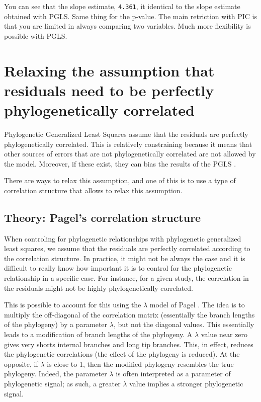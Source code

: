 \documentclass[
]{book}
\begin{document}
You can see that the slope estimate, \texttt{4.361}, it identical to the slope estimate obtained with PGLS. Same thing for the p-value. The main retriction with PIC is that you are limited in always comparing two variables. Much more flexibility is possible with PGLS.

\chapter{Relaxing the assumption that residuals need to be perfectly phylogenetically correlated}\label{relaxing-the-assumption-that-residuals-need-to-be-perfectly-phylogenetically-correlated}

Phylogenetic Generalized Least Squares assume that the residuals are perfectly phylogenetically correlated. This is relatively constraining because it means that other sources of errors that are not phylogenetically correlated are not allowed by the model. Moreover, if these exist, they can bias the results of the PGLS \citep{revell2010phylogenetic}.

There are ways to relax this assumption, and one of this is to use a type of correlation structure that allows to relax this assumption.

\section{Theory: Pagel's correlation structure}\label{theory-pagels-correlation-structure}

When controling for phylogenetic relationships with phylogenetic generalized least squares, we assume that the residuals are perfectly correlated according to the correlation structure. In practice, it might not be always the case and it is difficult to really know how important it is to control for the phylogenetic relationship in a specific case. For instance, for a given study, the correlation in the residuals might not be highly phylogenetically correlated.

This is possible to account for this using the \(\lambda\) model of Pagel \citep{pagel1999inferring}. The idea is to multiply the off-diagonal of the correlation matrix (essentially the branch lengths of the phylogeny) by a parameter \(\lambda\), but not the diagonal values. This essentially leads to a modification of branch lengths of the phylogeny. A \(\lambda\) value near zero gives very shorts internal branches and long tip branches. This, in effect, reduces the phylogenetic correlations (the effect of the phylogeny is reduced). At the opposite, if \(\lambda\) is close to 1, then the modified phylogeny resembles the true phylogeny. Indeed, the parameter \(\lambda\) is often interpreted as a parameter of phylogenetic signal; as such, a greater \(\lambda\) value implies a stronger phylogenetic signal.
\end{document}
